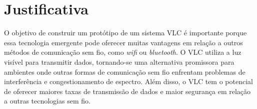\chapter{Justificativa}

O objetivo de construir um protótipo de um sistema VLC é importante porque essa tecnologia emergente pode oferecer muitas vantagens em relação a outros métodos de comunicação sem fio, como \textit{wifi} ou \textit{bluetooth}. O VLC utiliza a luz visível para transmitir dados, tornando-se uma alternativa promissora para ambientes onde outras formas de comunicação sem fio enfrentam problemas de interferência e congestionamento de espectro. Além disso, o VLC tem o potencial de oferecer maiores taxas de transmissão de dados e maior segurança em relação a outras tecnologias sem fio.

